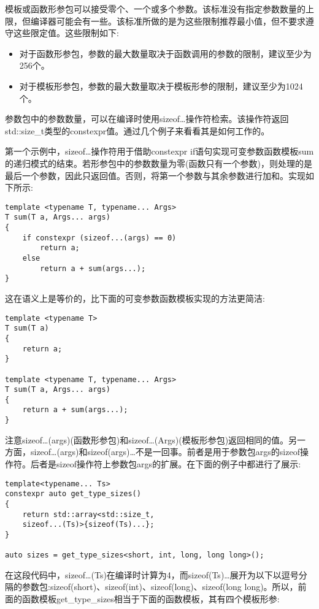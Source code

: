 
模板或函数形参包可以接受零个、一个或多个参数。该标准没有指定参数数量的上限，但编译器可能会有一些。该标准所做的是为这些限制推荐最小值，但不要求遵守这些限定值。这些限制如下:

\begin{itemize}
\item
对于函数形参包，参数的最大数量取决于函数调用的参数的限制，建议至少为256个。

\item
对于模板形参包，参数的最大数量取决于模板形参的限制，建议至少为1024个。
\end{itemize}

参数包中的参数数量，可以在编译时使用sizeof…操作符检索。该操作符返回std::size\_t类型的constexpr值。通过几个例子来看看其是如何工作的。

第一个示例中，sizeof…操作符用于借助constexpr if语句实现可变参数函数模板sum的递归模式的结束。若形参包中的参数数量为零(函数只有一个参数)，则处理的是最后一个参数，因此只返回值。否则，将第一个参数与其余参数进行加和。实现如下所示:

\begin{lstlisting}[style=styleCXX]
template <typename T, typename... Args>
T sum(T a, Args... args)
{
	if constexpr (sizeof...(args) == 0)
		return a;
	else
		return a + sum(args...);
}
\end{lstlisting}

这在语义上是等价的，比下面的可变参数函数模板实现的方法更简洁:

\begin{lstlisting}[style=styleCXX]
template <typename T>
T sum(T a)
{
	return a;
}

template <typename T, typename... Args>
T sum(T a, Args... args)
{
	return a + sum(args...);
}
\end{lstlisting}

注意sizeof…(args)(函数形参包)和sizeof…(Args)(模板形参包)返回相同的值。另一方面，sizeof…(args)和sizeof(args)…不是一回事。前者是用于参数包args的sizeof操作符。后者是sizeof操作符上参数包args的扩展。在下面的例子中都进行了展示:

\begin{lstlisting}[style=styleCXX]
template<typename... Ts>
constexpr auto get_type_sizes()
{
	return std::array<std::size_t,
	sizeof...(Ts)>{sizeof(Ts)...};
}

auto sizes = get_type_sizes<short, int, long, long long>();
\end{lstlisting}

在这段代码中，sizeof…(Ts)在编译时计算为4，而sizeof(Ts)…展开为以下以逗号分隔的参数包:sizeof(short)、sizeof(int)、sizeof(long)、sizeof(long long)。所以，前面的函数模板get\_type\_sizes相当于下面的函数模板，其有四个模板形参:

